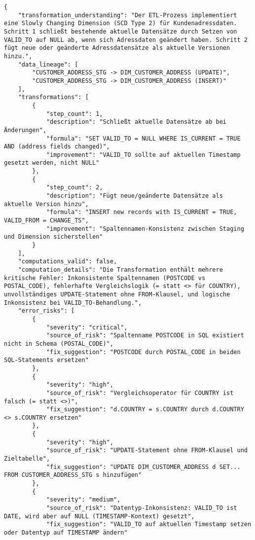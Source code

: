 \begin{lstlisting}[caption={Ausgabe: Claude Sonnet 4 Anwendungsfall 9 Hauptdurchlauf},label={claude_case9_prompt1}]
{
    "transformation_understanding": "Der ETL-Prozess implementiert eine Slowly Changing Dimension (SCD Type 2) für Kundenadressdaten. Schritt 1 schließt bestehende aktuelle Datensätze durch Setzen von VALID_TO auf NULL ab, wenn sich Adressdaten geändert haben. Schritt 2 fügt neue oder geänderte Adressdatensätze als aktuelle Versionen hinzu.",
    "data_lineage": [
        "CUSTOMER_ADDRESS_STG -> DIM_CUSTOMER_ADDRESS (UPDATE)",
        "CUSTOMER_ADDRESS_STG -> DIM_CUSTOMER_ADDRESS (INSERT)"
    ],
    "transformations": [
        {
            "step_count": 1,
            "description": "Schließt aktuelle Datensätze ab bei Änderungen",
            "formula": "SET VALID_TO = NULL WHERE IS_CURRENT = TRUE AND (address fields changed)",
            "improvement": "VALID_TO sollte auf aktuellen Timestamp gesetzt werden, nicht NULL"
        },
        {
            "step_count": 2,
            "description": "Fügt neue/geänderte Datensätze als aktuelle Version hinzu",
            "formula": "INSERT new records with IS_CURRENT = TRUE, VALID_FROM = CHANGE_TS",
            "improvement": "Spaltennamen-Konsistenz zwischen Staging und Dimension sicherstellen"
        }
    ],
    "computations_valid": false,
    "computation_details": "Die Transformation enthält mehrere kritische Fehler: Inkonsistente Spaltennamen (POSTCODE vs POSTAL_CODE), fehlerhafte Vergleichslogik (= statt <> für COUNTRY), unvollständiges UPDATE-Statement ohne FROM-Klausel, und logische Inkonsistenz bei VALID_TO-Behandlung.",
    "error_risks": [
        {
            "severity": "critical",
            "source_of_risk": "Spaltenname POSTCODE in SQL existiert nicht in Schema (POSTAL_CODE)",
            "fix_suggestion": "POSTCODE durch POSTAL_CODE in beiden SQL-Statements ersetzen"
        },
        {
            "severity": "high",
            "source_of_risk": "Vergleichsoperator für COUNTRY ist falsch (= statt <>)",
            "fix_suggestion": "d.COUNTRY = s.COUNTRY durch d.COUNTRY <> s.COUNTRY ersetzen"
        },
        {
            "severity": "high",
            "source_of_risk": "UPDATE-Statement ohne FROM-Klausel und Zieltabelle",
            "fix_suggestion": "UPDATE DIM_CUSTOMER_ADDRESS d SET... FROM CUSTOMER_ADDRESS_STG s hinzufügen"
        },
        {
            "severity": "medium",
            "source_of_risk": "Datentyp-Inkonsistenz: VALID_TO ist DATE, wird aber auf NULL (TIMESTAMP-Kontext) gesetzt",
            "fix_suggestion": "VALID_TO auf aktuellen Timestamp setzen oder Datentyp auf TIMESTAMP ändern"

\end{lstlisting}
